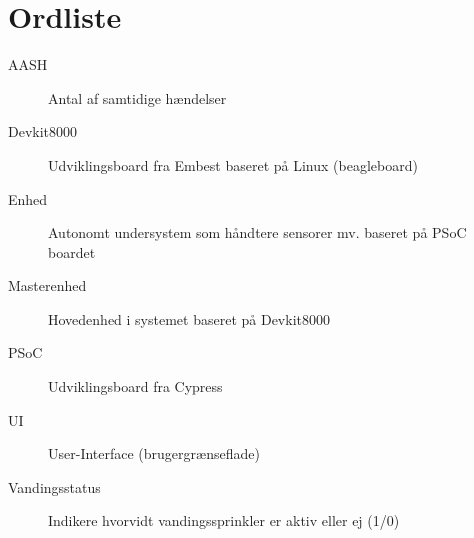 \chapter{Ordliste}


\begin{description}

\item[AASH] Antal af samtidige hændelser
\item[Devkit8000] Udviklingsboard fra Embest baseret på Linux (beagleboard)
\item[Enhed] Autonomt undersystem som håndtere sensorer mv. baseret på PSoC boardet
\item[Masterenhed] Hovedenhed i systemet baseret på Devkit8000
\item[PSoC] Udviklingsboard fra Cypress
\item[UI] User-Interface (brugergrænseflade)
\item[Vandingsstatus] Indikere hvorvidt vandingssprinkler er aktiv eller ej (1/0)

\end{description}